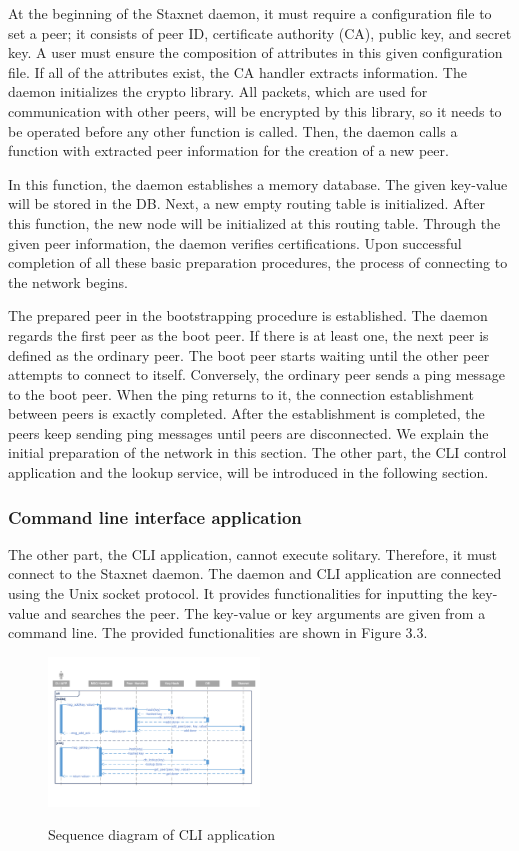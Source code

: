 At the beginning of the Staxnet daemon, it must require a configuration file to set a peer; it consists of peer ID, certificate authority (CA), public key, and secret key. A user must ensure the composition of attributes in this given configuration file. If all of the attributes exist, the CA handler extracts information. The daemon initializes the crypto library. All packets, which are used for communication with other peers, will be encrypted by this library, so it needs to be operated before any other function is called. Then, the daemon calls a function with extracted peer information for the creation of a new peer.

In this function, the daemon establishes a memory database. The given key-value will be stored in the DB. Next, a new empty routing table is initialized. After this function, the new node will be initialized at this routing table. Through the given peer information, the daemon verifies certifications. Upon successful completion of all these basic preparation procedures, the process of connecting to the network begins.

The prepared peer in the bootstrapping procedure is established. The daemon regards the first peer as the boot peer. If there is at least one, the next peer is defined as the ordinary peer. The boot peer starts waiting until the other peer attempts to connect to itself. Conversely, the ordinary peer sends a ping message to the boot peer. When the ping returns to it, the connection establishment between peers is exactly completed. After the establishment is completed, the peers keep sending ping messages until peers are disconnected. We explain the initial preparation of the network in this section. The other part, the CLI control application and the lookup service, will be introduced in the following section.

\subsubsection{Command line interface application}

The other part, the CLI application, cannot execute solitary. Therefore, it must connect to the Staxnet daemon. The daemon and CLI application are connected using the Unix socket protocol. It provides functionalities for inputting the key-value and searches the peer. The key-value or key arguments are given from a command line. The provided functionalities are shown in Figure 3.3.

\begin{figure}[!ht]
	\centering
	\includegraphics[width=0.5\textwidth]{images/seq3_3.pdf}\\
	\caption{Sequence diagram of CLI application}
	\label{fig:CLI}
\end{figure}

